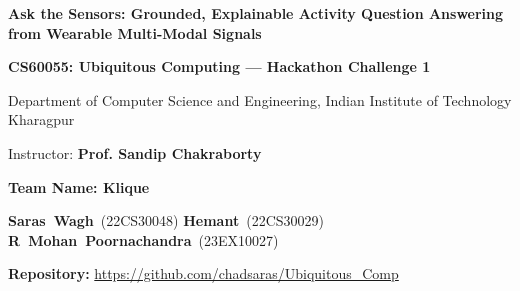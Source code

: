 \documentclass[11pt,a4paper]{article}
\begin{document}
\begin{center}
  {\LARGE \textbf{Ask the Sensors: Grounded, Explainable Activity Question Answering from Wearable Multi-Modal Signals}\par}
  \vspace{0.8em}
  {\large \textbf{CS60055: Ubiquitous Computing --- Hackathon Challenge 1}\par}
  \vspace{0.4em}
  {\normalsize Department of Computer Science and Engineering, Indian Institute of Technology Kharagpur\par}
  \vspace{0.3em}
  {\normalsize Instructor: \textbf{Prof. Sandip Chakraborty}\par}
  \vspace{0.8em}
  {\normalsize \textbf{Team Name: Klique}\par}
  \vspace{0.3em}
  {\normalsize
    \mbox{\textbf{Saras Wagh} (22CS30048)} \enspace\textbar\enspace
    \mbox{\textbf{Hemant} (22CS30029)} \enspace\textbar\enspace
    \mbox{\textbf{R Mohan Poornachandra} (23EX10027)}\par
  }
  \vspace{0.8em}
  {\small \textbf{Repository:} \url{https://github.com/chadsaras/Ubiquitous_Comp}\par}
  \vspace{1.0em}
\end{center}
\end{document}
